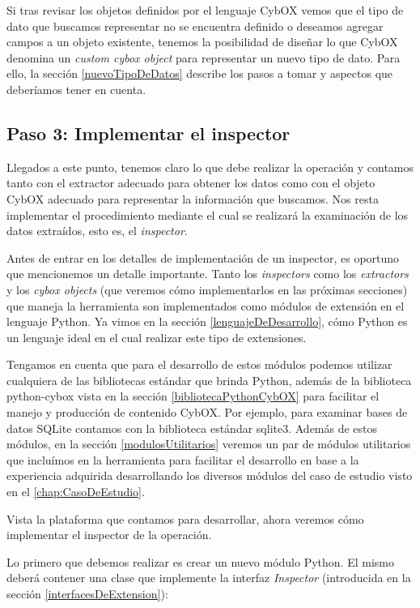 Si tras revisar los objetos definidos por el lenguaje CybOX vemos que el tipo de dato que buscamos representar no se encuentra definido o deseamos agregar campos a un objeto existente, tenemos la posibilidad de diseñar lo que CybOX denomina un \emph{custom cybox object} para representar un nuevo tipo de dato. Para ello, la sección \ref{nuevoTipoDeDatos} describe los pasos a tomar y aspectos que deberíamos tener en cuenta.

\subsection*{Paso 3: Implementar el inspector}
Llegados a este punto, tenemos claro lo que debe realizar la operación y contamos tanto con el extractor adecuado para obtener los datos como con el objeto CybOX adecuado para representar la información que buscamos. Nos resta implementar el procedimiento mediante el cual se realizará la examinación de los datos extraídos, esto es, el \emph{inspector}.

Antes de entrar en los detalles de implementación de un inspector, es oportuno que mencionemos un detalle importante. Tanto los \emph{inspectors} como los \emph{extractors} y los \emph{cybox objects} (que veremos cómo implementarlos en las próximas secciones) que maneja la herramienta son implementados como módulos de extensión en el lenguaje Python. Ya vimos en la sección \ref{lenguajeDeDesarrollo}, cómo Python es un lenguaje ideal en el cual realizar este tipo de extensiones.

Tengamos en cuenta que para el desarrollo de estos módulos podemos utilizar cualquiera de las bibliotecas estándar que brinda Python, además de la biblioteca python-cybox vista en la sección \ref{bibliotecaPythonCybOX} para facilitar el manejo y producción de contenido CybOX. Por ejemplo, para examinar bases de datos SQLite contamos con la biblioteca estándar sqlite3. Además de estos módulos, en la sección \ref{modulosUtilitarios} veremos un par de módulos utilitarios que incluímos en la herramienta para facilitar el desarrollo en base a la experiencia adquirida desarrollando los diversos módulos del caso de estudio visto en el \autoref{chap:CasoDeEstudio}.

Vista la plataforma que contamos para desarrollar, ahora veremos cómo implementar el inspector de la operación.

Lo primero que debemos realizar es crear un nuevo módulo Python. El mismo deberá contener una clase que implemente la interfaz \emph{Inspector} (introducida en la sección \ref{interfacesDeExtension}):
\newline

